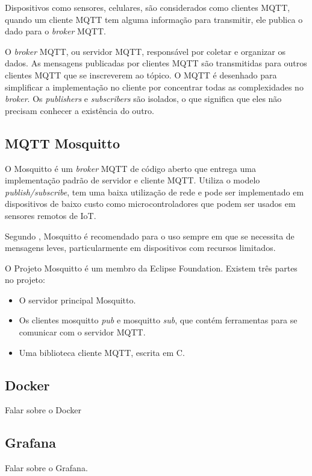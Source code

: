 Dispositivos como sensores, celulares, são considerados como clientes MQTT, quando um cliente MQTT tem alguma informação para transmitir, ele publica o dado para o \textit {broker} MQTT.

O \textit {broker} MQTT, ou servidor MQTT, responsável por coletar e organizar os dados. As mensagens publicadas por clientes MQTT são transmitidas para outros clientes MQTT que se inscreverem ao tópico. O MQTT é desenhado para simplificar a implementação no cliente por concentrar todas as complexidades no \textit {broker}. Os \textit {publishers} e \textit {subscribers} são isolados, o que significa que eles não precisam conhecer a existência do outro.

\subsection{MQTT Mosquitto}

O Mosquitto é um \textit{broker} MQTT de código aberto \cite{Kodali2017} que entrega uma implementação padrão de servidor e cliente MQTT. Utiliza o modelo \textit{publish/subscribe}, tem uma baixa utilização de rede e pode ser implementado em dispositivos de baixo custo como microcontroladores que podem ser usados em sensores remotos de IoT. \cite{Light}

Segundo \cite{Light}, Mosquitto é recomendado para o uso sempre em que se necessita de mensagens leves, particularmente em dispositivos com recursos limitados.

O Projeto Mosquitto é um membro da Eclipse Foundation. Existem três partes no projeto:

\begin{itemize}
	\item O servidor principal Mosquitto.
	\item Os clientes mosquitto \textit{pub} e mosquitto \textit{sub}, que contém ferramentas para se comunicar com o servidor MQTT.
	\item Uma biblioteca cliente MQTT, escrita em C.
\end{itemize}

\subsection{Docker}
Falar sobre o Docker

\subsection{Grafana}
Falar sobre o Grafana.